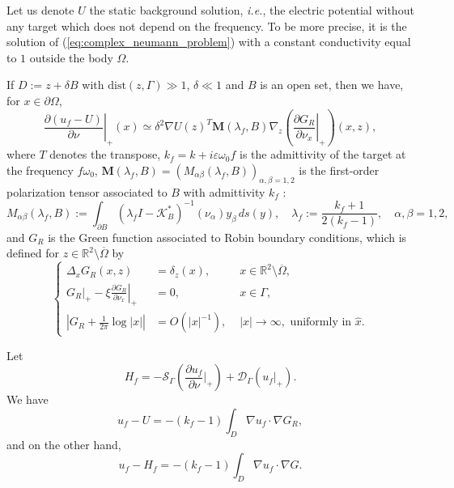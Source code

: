 \begin{proposition} \label{propos2}
Let us denote $U$ the static background solution, \emph{i.e.},
the electric potential without any target which does not depend on
the frequency. To be more precise, it is the solution of (\ref{eq:complex_neumann_problem}) with
a constant conductivity equal to $1$ outside the body $\Omega$.

If $D:=z+\delta B$ with ${\textrm{dist}}(z,\Gamma)\gg1$, $\delta\ll1$
and $B$ is an open set, then we have, for $x \in \partial\Omega$,
\begin{equation}
\left.\frac{\partial (u_f - U)}{\partial \nu}\right|_+(x) \simeq \delta^{2}\nabla U(z)^T \mathbf{M}(\lambda_{f},B)
\nabla_{z}\left(\left.\frac{\partial
G_{R}}{\partial\nu_{x}}\right|_{+}\right)(x,z),\label{eq:SFR-first-approx}
\end{equation}
 where $T$ denotes the transpose, $k_{f}= k + i \varepsilon \omega_0 f$ is the admittivity of the
 target at the
frequency $f\omega_{0}$, $\mathbf{M}(\lambda_f,B) = (M_{\alpha
\beta}(\lambda_f,B))_{\alpha, \beta=1,2}$ is the first-order
polarization tensor associated to $B$ with admittivity $k_f$
\cite{ammari2007polarization}:
$$
M_{\alpha \beta}(\lambda_f,B):= \int_{\partial B} (\lambda_f I -
\mathcal{K}_{B}^{*})^{-1}(\nu_\alpha) y_\beta \, ds(y), \quad
\lambda_f:= \frac{k_f +1}{2(k_f -1)}, \quad \alpha, \beta=1,2,
$$
 and $G_{R}$ is the Green function
associated to Robin boundary conditions, which is defined for
$z\in \mathbb{R}^{2}\setminus\overline{\Omega}$ by
\begin{equation}
\left\{ \begin{alignedat}{2}\Delta_{x}G_{R}(x,z) & =\delta_{z}(x), & \,\, x\in\mathbb{R}^{2}\setminus\overline{\Omega},\\
{}\left. G_{R} \right|_{+} -  \xi\left.\frac{\partial G_{R}}{\partial\nu_{x}}\right|_{+} & =0, & \,\, x\in\Gamma,\\
\left|G_{R} + \frac{1}{2\pi} \log |x| \right| & =
{O}(\left|x\right|^{-1}), &
\,\,\left|x\right|\rightarrow\infty,\text{ uniformly in }\hat{x}.
\end{alignedat}
\right.\label{eq:green-fonction-robin}
\end{equation}
\end{proposition}
\proof Let
$$
H_f = - \mathcal{S}_\Gamma(\frac{\partial u_f}{\partial
\nu}\big|_+) + \mathcal{D}_\Gamma (u_f \big|_+).
$$
We have
$$
u_f - U = - (k_f -1) \int_D \nabla u_f \cdot \nabla G_R,
$$
and on the other hand,
$$
u_f - H_f = - (k_f -1) \int_D \nabla u_f \cdot \nabla G.
$$
